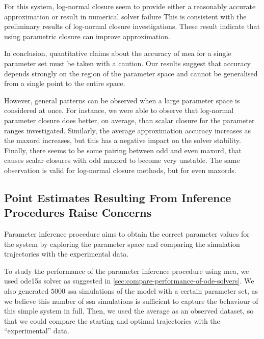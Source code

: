 For this system, log-normal closure seem to provide either a reasonably accurate approximation or result in numerical solver failure
This is consistent with the preliminary results of log-normal closure investigations\cite{lakatos_preparation_2014}.
These result indicate that using parametric closure can improve approximation.

In conclusion, quantitative claims about the accuracy of \gls{mea} for a single parameter set must be taken with a caution.
Our results suggest that accuracy depends strongly on the region of the parameter space and cannot be generalised from a single point to the entire space.

However, general patterns can be observed when a large parameter space is considered at once. 
For instance, we were able to observe that log-normal parameter closure does better, on average, than scalar closure for the parameter ranges investigated. 
Similarly, the average approximation accuracy increases as the \gls{maxord} increases, but this has a negative impact on the solver stability.
Finally, there seems to be some pairing between odd and even \gls{maxord}, 
that causes scalar closures with odd \gls{maxord} to become very unstable.
The same observation is valid for log-normal closure methods, but for even \gls{maxord}s.



\subsection{Point Estimates Resulting From Inference Procedures Raise Concerns}
\label{sec:results:inference}

Parameter inference procedure aims to obtain the correct parameter values for the system by exploring the parameter space and comparing the simulation trajectories with the experimental data.

To study the performance of the parameter inference procedure using \acrlong{mea},
we used ode15s solver as suggested in \autoref{sec:compare-performance-of-ode-solvers}. 
We also generated $5000$ \acrfull{ssa} simulations of the \pft{} model with a certain parameter set, as we believe this number of \gls{ssa} simulations is sufficient to capture the behaviour of this simple system in full.
Then, we used the average as an observed dataset, so that we could compare the starting and optimal trajectories with the ``experimental'' data.


